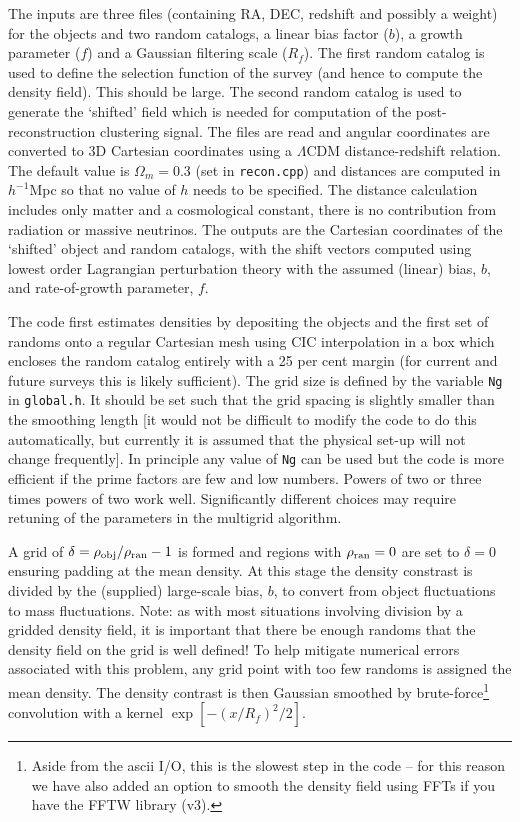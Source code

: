 \documentclass[a4paper,11pt]{article}
\begin{document}
The inputs are three files (containing RA, DEC, redshift and possibly a weight)
for the objects and two random catalogs, a linear bias factor ($b$), a growth
parameter ($f$) and a Gaussian filtering scale ($R_f$).
The first random catalog is used to define the selection function of the
survey (and hence to compute the density field).  This should be large.  The
second random catalog is used to generate the `shifted' field which is needed
for computation of the post-reconstruction clustering signal.
The files are read and angular coordinates are converted to 3D Cartesian
coordinates using a $\Lambda$CDM distance-redshift relation.  The default
value is $\Omega_m=0.3$ (set in {\tt recon.cpp}) and distances are computed
in $h^{-1}$Mpc so that no value of $h$ needs to be specified.  The distance
calculation includes only matter and a cosmological constant, there is no
contribution from radiation or massive neutrinos.
The outputs are the Cartesian coordinates of the `shifted' object and
random catalogs, with the shift vectors computed using lowest order
Lagrangian perturbation theory with the assumed (linear) bias, $b$, and
rate-of-growth parameter, $f$.

The code first estimates densities by depositing the objects and the first
set of randoms onto a regular Cartesian mesh using CIC interpolation in a box
which encloses the random catalog entirely with a 25 per cent margin (for
current and future surveys this is likely sufficient).
The grid size is defined by the variable {\tt Ng} in {\tt global.h}.  It
should be set such that the grid spacing is slightly smaller than the smoothing
length [it would not be difficult to modify the code to do this automatically,
but currently it is assumed that the physical set-up will not change
frequently].  In principle any value of {\tt Ng} can be used but the code is
more efficient if the prime factors are few and low numbers.  Powers of two or
three times powers of two work well.  Significantly different choices may
require retuning of the parameters in the multigrid algorithm.

A grid of $\delta=\rho_{\rm obj}/\rho_{\rm ran}-1$ is formed and regions
with $\rho_{\rm ran}=0$ are set to $\delta=0$ ensuring padding at the
mean density.
At this stage the density constrast is divided
by the (supplied) large-scale bias, $b$, to convert from object fluctuations
to mass fluctuations.
Note: as with most situations involving division by a gridded density field,
it is important that there be enough randoms that the density field on the
grid is well defined!  To help mitigate numerical errors associated with this
problem, any grid point with too few randoms is assigned the mean density.
The density contrast is then Gaussian smoothed by brute-force\footnote{Aside
{}from the ascii I/O, this is the slowest step in the code -- for this reason
we have also added an option to smooth the density field using FFTs if you
have the FFTW library (v3).} convolution with a kernel $\exp[-(x/R_f)^2/2]$.
\end{document}
